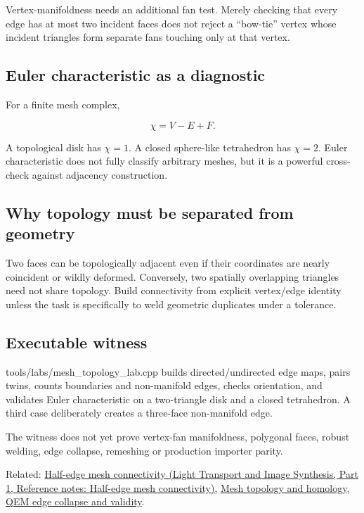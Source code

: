 Vertex-manifoldness needs an additional fan test. Merely checking that every edge has at most two incident faces does not reject a ``bow-tie'' vertex whose incident triangles form separate fans touching only at that vertex.

\subsection{Euler characteristic as a diagnostic}\label{appendix-faac749c9cdd-euler-characteristic-as-a-diagnostic}

\hypertarget{appendix-faac749c9cdd-euler-characteristic-as-a-diagnostic}{}

For a finite mesh complex,

\[
\chi = V-E+F.
\]

A topological disk has \(\chi=1\). A closed sphere-like tetrahedron has \(\chi=2\). Euler characteristic does not fully classify arbitrary meshes, but it is a powerful cross-check against adjacency construction.

\subsection{Why topology must be separated from geometry}\label{appendix-faac749c9cdd-why-topology-must-be-separated-from-geometry}

\hypertarget{appendix-faac749c9cdd-why-topology-must-be-separated-from-geometry}{}

Two faces can be topologically adjacent even if their coordinates are nearly coincident or wildly deformed. Conversely, two spatially overlapping triangles need not share topology. Build connectivity from explicit vertex/edge identity unless the task is specifically to weld geometric duplicates under a tolerance.

\subsection{Executable witness}\label{appendix-faac749c9cdd-executable-witness}

\hypertarget{appendix-faac749c9cdd-executable-witness}{}

tools/labs/mesh\_topology\_lab.cpp builds directed/undirected edge maps, pairs twins, counts boundaries and non-manifold edges, checks orientation, and validates Euler characteristic on a two-triangle disk and a closed tetrahedron. A third case deliberately creates a three-face non-manifold edge.

The witness does not yet prove vertex-fan manifoldness, polygonal faces, robust welding, edge collapse, remeshing or production importer parity.

Related: \href{../04-Light-Transport-and-Image-Synthesis-P01/main.pdf\#appendix-1aea26b2307f}{Half-edge mesh connectivity (Light Transport and Image Synthesis, Part 1, Reference notes: Half-edge mesh connectivity)}, \hyperref[appendix-e38976cbbf86]{Mesh topology and homology}, \hyperref[appendix-89db9fe1bc8a]{QEM edge collapse and validity}.
